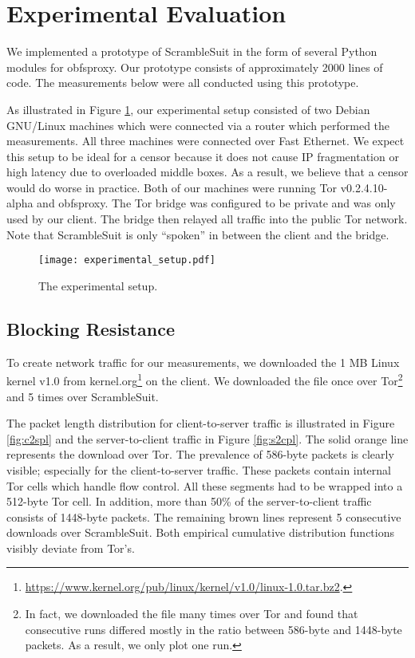 \documentclass{sig-alternate}
\newcommand{\pt}{\textsf{ScrambleSuit}}
\numberwithin{enumi}{section}
\numberwithin{notesctr}{section}
\begin{document}
{\section{Experimental Evaluation}
\label{sec:experimental_evaluation}


We implemented a prototype of \pt{} in the form of several Python modules for obfsproxy. Our
prototype consists of approximately 2000 lines of code. The measurements below were all
conducted using this prototype.

As illustrated in Figure \ref{fig:experimental_setup}, our experimental setup consisted of two
Debian GNU/Linux machines which were connected via a router which performed the measurements. All
three machines were connected over Fast Ethernet. We expect this setup to be ideal for a censor
because it does not cause IP fragmentation or high latency due to overloaded middle boxes. As a
result, we believe that a censor would do worse in practice. Both of our machines were running Tor
v0.2.4.10-alpha and obfsproxy. The Tor bridge was configured to be private and was only used by
our client. The bridge then relayed all traffic into the public Tor network. Note that \pt{} is only
``spoken'' in between the client and the bridge.

\begin{figure}[h]
\centering
\begin{center}
		\texttt{[image: experimental\_setup.pdf]}
	\end{center}
	\caption{The experimental setup.}
	\label{fig:experimental_setup}
\end{figure}


\subsection{Blocking Resistance}
\label{sec:blocking_resistance}
To create network traffic for our measurements, we downloaded the 1 MB Linux kernel v1.0 from
kernel.org\footnote{\url{https://www.kernel.org/pub/linux/kernel/v1.0/linux-1.0.tar.bz2}.} on
the client. We downloaded the file once over Tor\footnote{In fact, we downloaded the file many times
over Tor and found that consecutive runs differed mostly in the ratio between 586-byte and 1448-byte
packets. As a result, we only plot one run.} and 5 times over \pt{}.

The packet length distribution for client-to-server traffic is illustrated in Figure \ref{fig:c2spl}
and the server-to-client traffic in Figure \ref{fig:s2cpl}. The solid orange line represents the
download over Tor. The prevalence of 586-byte packets is clearly visible; especially for the
client-to-server traffic. These packets contain internal Tor cells which handle flow control. All
these segments had to be wrapped into a 512-byte Tor cell. In addition, more than 50\% of the
server-to-client traffic consists of 1448-byte packets. The remaining brown lines represent 5
consecutive downloads over \pt{}. Both empirical cumulative distribution functions visibly deviate
from Tor's.



}
\end{document}
